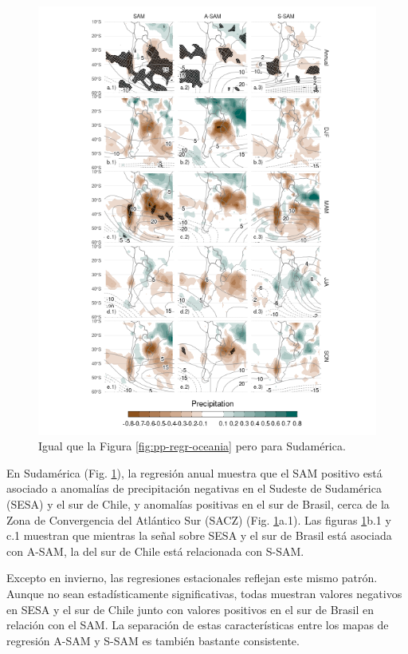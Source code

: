\documentclass[12pt,oneside]{reedthesis}
\begin{document}
\begin{figure}
\includegraphics{figures/30-sam/pp-regr-america-1} \caption{Igual que la Figura \ref{fig:pp-regr-oceania} pero para Sudamérica.}\label{fig:pp-regr-america}
\end{figure}

En Sudamérica (Fig. \ref{fig:pp-regr-america}), la regresión anual muestra que el SAM positivo está asociado a anomalías de precipitación negativas en el Sudeste de Sudamérica (SESA) y el sur de Chile, y anomalías positivas en el sur de Brasil, cerca de la Zona de Convergencia del Atlántico Sur (SACZ) (Fig. \ref{fig:pp-regr-america}a.1).
Las figuras \ref{fig:pp-regr-america}b.1 y c.1 muestran que mientras la señal sobre SESA y el sur de Brasil está asociada con A-SAM, la del sur de Chile está relacionada con S-SAM.

Excepto en invierno, las regresiones estacionales reflejan este mismo patrón.
Aunque no sean estadísticamente significativas, todas muestran valores negativos en SESA y el sur de Chile junto con valores positivos en el sur de Brasil en relación con el SAM.
La separación de estas características entre los mapas de regresión A-SAM y S-SAM es también bastante consistente.
\end{document}
